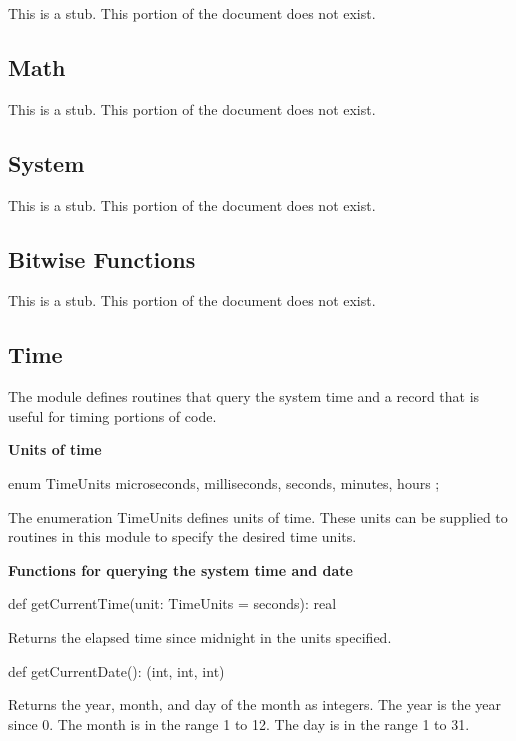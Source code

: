 \label{Standard_Modules}

This is a stub.  This portion of the document does not exist.

\subsection{Math}
\label{Math}

This is a stub.  This portion of the document does not exist.

\subsection{System}
\label{System}

This is a stub.  This portion of the document does not exist.

\subsection{Bitwise Functions}
\label{Bitwise_Functions}

This is a stub.  This portion of the document does not exist.

\subsection{Time}
\label{Time}

The module  defines routines that query the system time and
a record  that is useful for timing portions of code.

{\bf Units of time}

\begin{chapel}
enum TimeUnits { microseconds, milliseconds, seconds, minutes, hours };
\end{chapel}
The enumeration TimeUnits defines units of time.  These units can be
supplied to routines in this module to specify the desired time units.

{\bf Functions for querying the system time and date}

\begin{chapel}
def getCurrentTime(unit: TimeUnits = seconds): real
\end{chapel}
Returns the elapsed time since midnight in the units specified.

\begin{chapel}
def getCurrentDate(): (int, int, int)
\end{chapel}
Returns the year, month, and day of the month as integers.  The year
is the year since 0.  The month is in the range 1 to 12.  The day is
in the range 1 to 31.

